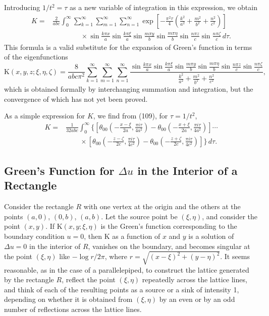 Introducing $1/t^2=\tau$ as a new variable of integration in this expression, we obtain
\[
\begin{aligned}
K={}&\frac2{abc}\int_0^{\infty}\sum_{k=1}^{\infty}\sum_{m=1}^{\infty}\sum_{n=1}^{\infty}
\exp\left[-\frac{\pi^2\tau}{4}\left(\frac{k^2}{a^2}+\frac{m^2}{b^2}+\frac{n^2}{c^2}\right)\right]\\
&\qquad\qquad\times\sin\frac{k\pi x}{a}\sin\frac{k\pi\xi}{a}
\sin\frac{m\pi y}{b}\sin\frac{m\pi\eta}{b}
\sin\frac{n\pi z}{c}\sin\frac{n\pi\zeta}{c}\,d\tau.
\end{aligned}
\]
This formula is a valid substitute for the expansion of Green's function in terms of the eigenfunctions
\[
\mathrm K(x,y,z;\xi,\eta,\zeta)=\frac8{abc\pi^2}\sum_{k=1}^{\infty}\sum_{m=1}^{\infty}\sum_{n=1}^{\infty}
\frac{\sin\frac{k\pi x}{a}\sin\frac{k\pi\xi}{a}\sin\frac{m\pi y}{b}\sin\frac{m\pi\eta}{b}\sin\frac{n\pi z}{c}\sin\frac{n\pi\zeta}{c}}{\frac{k^2}{a^2}+\frac{m^2}{b^2}+\frac{n^2}{c^2}},
\]
which is obtained formally by interchanging summation and integration, but the convergence of which has not yet been proved.

As a simple expression for $K$, we find from (109), for $\tau=1/t^2$,
\[
\begin{aligned}
K={}&\frac1{32abc}\int_0^{\infty}
\Bigg\{\left[\theta_{00}\left(-\frac{x-\xi}{2a},\frac{\pi i\tau}{4a^2}\right)-\theta_{00}\left(-\frac{x+\xi}{2a},\frac{\pi i\tau}{4a^2}\right)\right]\cdots\\
&\qquad\times\left[\theta_{00}\left(-\frac{z-\zeta}{2c},\frac{\pi i\tau}{4c^2}\right)-\theta_{00}\left(-\frac{z+\zeta}{2c},\frac{\pi i\tau}{4c^2}\right)\right]\Bigg\}\,d\tau.
\end{aligned}
\]

\subsection{Green's Function for $\Delta u$ in the Interior of a Rectangle}
Consider the rectangle $R$ with one vertex at the origin and the others at the points $(a,0)$, $(0,b)$, $(a,b)$. Let the source point be $(\xi,\eta)$, and consider the point $(x,y)$. If $\mathrm K(x,y;\xi,\eta)$ is the Green's function corresponding to the boundary condition $u=0$, then $\mathrm K$ as a function of $x$ and $y$ is a solution of $\Delta u=0$ in the interior of $R$, vanishes on the boundary, and becomes singular at the point $(\xi,\eta)$ like $-\log r/2\pi$, where $r=\sqrt{(x-\xi)^2+(y-\eta)^2}$. It seems reasonable, as in the case of a parallelepiped, to construct the lattice generated by the rectangle $R$, reflect the point $(\xi,\eta)$ repeatedly across the lattice lines, and think of each of the resulting points as a source or a sink of intensity 1, depending on whether it is obtained from $(\xi,\eta)$ by an even or by an odd number of reflections across the lattice lines.

